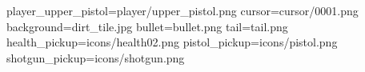 player_upper_pistol=player/upper_pistol.png
cursor=cursor/0001.png
background=dirt_tile.jpg
bullet=bullet.png
tail=tail.png
health_pickup=icons/health02.png
pistol_pickup=icons/pistol.png
shotgun_pickup=icons/shotgun.png
